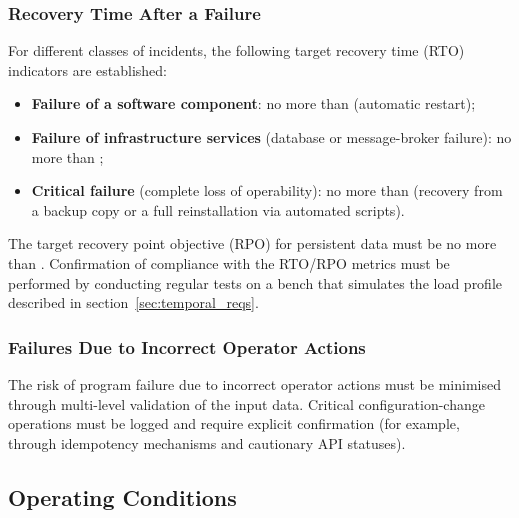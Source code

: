 \documentclass[12pt,a4paper]{extarticle}
\begin{document}
\subsubsection{Recovery Time After a Failure}

\begin{hseExample}
For different classes of incidents, the following target recovery time (RTO) indicators are established:
\begin{itemize}[nosep, leftmargin=1.25cm]
    \item \textbf{Failure of a software component}: no more than  (automatic restart);
    \item \textbf{Failure of infrastructure services} (database or message-broker failure): no more than ;
    \item \textbf{Critical failure} (complete loss of operability): no more than  (recovery from a backup copy or a full reinstallation via automated scripts).
\end{itemize}

The target recovery point objective (RPO) for persistent data must be no more than . Confirmation of compliance with the RTO/RPO metrics must be performed by conducting regular tests on a bench that simulates the load profile described in section~\ref{sec:temporal_reqs}.
\end{hseExample}

\subsubsection{Failures Due to Incorrect Operator Actions}

\begin{hseExample}
The risk of program failure due to incorrect operator actions must be minimised through multi-level validation of the input data. Critical configuration-change operations must be logged and require explicit confirmation (for example, through idempotency mechanisms and cautionary API statuses).
\end{hseExample}

\clearpage

\subsection{Operating Conditions}
\end{document}
